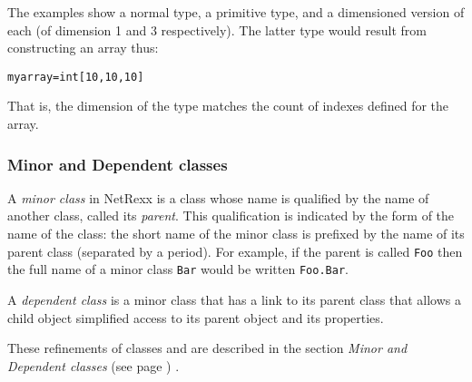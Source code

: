 The examples show a normal type, a primitive type, and a dimensioned
version of each (of dimension 1 and 3 respectively).  The latter type
would result from constructing an array thus:
\begin{alltt}
myarray=int[10,10,10]
\end{alltt}
That is, the dimension of the type matches the count of indexes
defined for the array.
\subsubsection{Minor and Dependent classes}\label{"id"}
 
A \emph{minor class} in NetRexx is a class whose name is qualified by
the name of another class, called its \emph{parent}.
This qualification is indicated by the form of the name of the class:
the short name of the minor class is prefixed by the name of its parent
class (separated by a period).
For example, if the parent is called \texttt{Foo} then the full name of a
minor class \texttt{Bar} would be written \texttt{Foo.Bar}.
 
A \emph{dependent class} is a minor class that has a link to its
parent class that allows a child object simplified access to its
parent object and its properties.
 
These refinements of classes and are described in the
section  \emph{Minor and Dependent classes} (see page \pageref{refminor}) .
